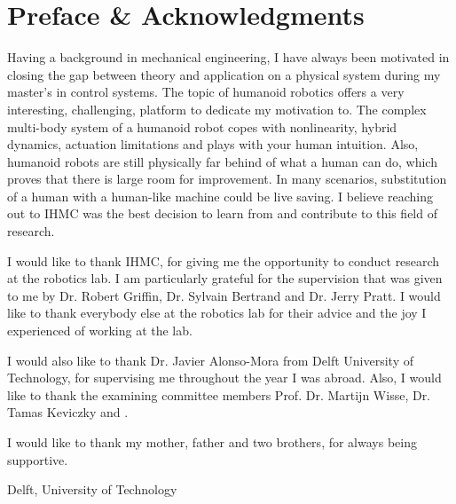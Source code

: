 %
\chapter{Preface \& Acknowledgments}%
Having a background in mechanical engineering, I have always been motivated in closing the gap between theory and application on a physical system during my master's in control systems. The topic of humanoid robotics offers a very interesting, challenging, platform to dedicate my motivation to. The complex multi-body system of a humanoid robot copes with nonlinearity, hybrid dynamics, actuation limitations and plays with your human intuition. Also, humanoid robots are still physically far behind of what a human can do, which proves that there is large room for improvement. In many scenarios, substitution of a human with a human-like machine could be live saving. I believe reaching out to \ac{IHMC} was the best decision to learn from and contribute to this field of research.

I would like to thank \ac{IHMC}, for giving me the opportunity to conduct research at the robotics lab. I am particularly grateful for the supervision that was given to me by Dr. Robert Griffin, Dr. Sylvain Bertrand and Dr. Jerry Pratt. I would like to thank everybody else at the robotics lab for their advice and the joy I experienced of working at the lab. 

I would also like to thank Dr. Javier Alonso-Mora from Delft University of Technology, for supervising me throughout the year I was abroad. Also, I would like to thank the examining committee members Prof. Dr. Martijn Wisse, Dr. Tamas Keviczky and .

I would like to thank my mother, father and two brothers, for always being supportive.

\vspace*{15mm}

Delft, University of Technology \hfill \mscname \\
\mscdate